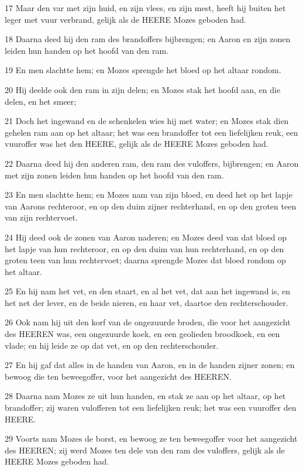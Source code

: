 \par 17 Maar den var met zijn huid, en zijn vlees, en zijn mest, heeft hij buiten het leger met vuur verbrand, gelijk als de HEERE Mozes geboden had.
\par 18 Daarna deed hij den ram des brandoffers bijbrengen; en Aaron en zijn zonen leiden hun handen op het hoofd van den ram.
\par 19 En men slachtte hem; en Mozes sprengde het bloed op het altaar rondom.
\par 20 Hij deelde ook den ram in zijn delen; en Mozes stak het hoofd aan, en die delen, en het smeer;
\par 21 Doch het ingewand en de schenkelen wies hij met water; en Mozes stak dien gehelen ram aan op het altaar; het was een brandoffer tot een liefelijken reuk, een vuuroffer was het den HEERE, gelijk als de HEERE Mozes geboden had.
\par 22 Daarna deed hij den anderen ram, den ram des vuloffers, bijbrengen; en Aaron met zijn zonen leiden hun handen op het hoofd van den ram.
\par 23 En men slachtte hem; en Mozes nam van zijn bloed, en deed het op het lapje van Aarons rechteroor, en op den duim zijner rechterhand, en op den groten teen van zijn rechtervoet.
\par 24 Hij deed ook de zonen van Aaron naderen; en Mozes deed van dat bloed op het lapje van hun rechteroor, en op den duim van hun rechterhand, en op den groten teen van hun rechtervoet; daarna sprengde Mozes dat bloed rondom op het altaar.
\par 25 En hij nam het vet, en den staart, en al het vet, dat aan het ingewand is, en het net der lever, en de beide nieren, en haar vet, daartoe den rechterschouder.
\par 26 Ook nam hij uit den korf van de ongezuurde broden, die voor het aangezicht des HEEREN was, een ongezuurde koek, en een geolieden broodkoek, en een vlade; en hij leide ze op dat vet, en op den rechterschouder.
\par 27 En hij gaf dat alles in de handen van Aaron, en in de handen zijner zonen; en bewoog die ten beweegoffer, voor het aangezicht des HEEREN.
\par 28 Daarna nam Mozes ze uit hun handen, en stak ze aan op het altaar, op het brandoffer; zij waren vulofferen tot een liefelijken reuk; het was een vuuroffer den HEERE.
\par 29 Voorts nam Mozes de borst, en bewoog ze ten beweegoffer voor het aangezicht des HEEREN; zij werd Mozes ten dele van den ram des vuloffers, gelijk als de HEERE Mozes geboden had.
